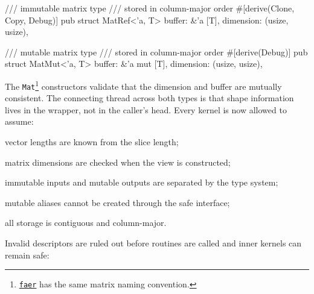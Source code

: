 \documentclass[11pt]{article}
\begin{document}
\begin{rust}
/// immutable matrix type 
/// stored in column-major order
#[derive(Clone, Copy, Debug)]
pub struct MatRef<'a, T> { 
    buffer: &'a [T], 
    dimension: (usize, usize), 
}

/// mutable matrix type 
/// stored in column-major order
#[derive(Debug)]
pub struct MatMut<'a, T> { 
    buffer: &'a mut [T],
    dimension: (usize, usize), 
}
\end{rust} 
The \verb|Mat|\footnote{\href{https://faer.veganb.tw}{\texttt{faer}} has the same matrix naming convention.} constructors validate that the dimension and buffer are mutually consistent.
The connecting thread across both types is that shape information lives in the wrapper,
not in the caller's head. Every kernel is now allowed to assume:
\begin{notelist}
    \item vector lengths are known from the slice length;
    \item matrix dimensions are checked when the view is constructed;
    \item immutable inputs and mutable outputs are separated by the type system;
    \item mutable aliases cannot be created through the safe interface;
    \item all storage is contiguous and column-major.
\end{notelist}
Invalid descriptors are ruled out before routines are called and inner kernels can remain safe: \\[1em]
\end{document}
